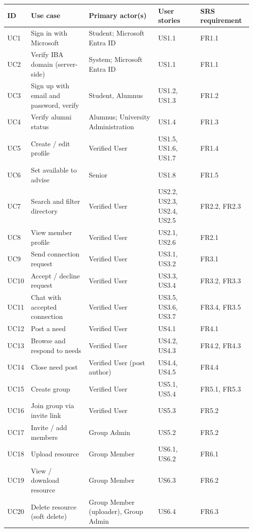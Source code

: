 \documentclass[10pt,a4paper]{article}
\begin{document}
{\small
\begin{longtable}{@{}l >{\raggedright\arraybackslash}p{50mm} >{\raggedright\arraybackslash}p{38mm} >{\raggedright\arraybackslash}p{24mm} >{\raggedright\arraybackslash}p{22mm}@{}}
\toprule
\textbf{ID} & \textbf{Use case} & \textbf{Primary actor(s)} & \textbf{User stories} & \textbf{SRS requirement}\\\midrule\endhead
\bottomrule\endfoot
UC1 & Sign in with Microsoft & Student; Microsoft Entra ID & US1.1 & FR1.1\\
UC2 & Verify IBA domain (server-side) & System; Microsoft Entra ID & US1.1 & FR1.1\\
UC3 & Sign up with email and password, verify & Student, Alumnus & US1.2, US1.3 & FR1.2\\
UC4 & Verify alumni status & Alumnus; University Administration & US1.4 & FR1.3\\
UC5 & Create / edit profile & Verified User & US1.5, US1.6, US1.7 & FR1.4\\
UC6 & Set available to advise & Senior & US1.8 & FR1.5\\
UC7 & Search and filter directory & Verified User & US2.2, US2.3, US2.4, US2.5 & FR2.2, FR2.3\\
UC8 & View member profile & Verified User & US2.1, US2.6 & FR2.1\\
UC9 & Send connection request & Verified User & US3.1, US3.2 & FR3.1\\
UC10 & Accept / decline request & Verified User & US3.3, US3.4 & FR3.2, FR3.3\\
UC11 & Chat with accepted connection & Verified User & US3.5, US3.6, US3.7 & FR3.4, FR3.5\\
UC12 & Post a need & Verified User & US4.1 & FR4.1\\
UC13 & Browse and respond to needs & Verified User & US4.2, US4.3 & FR4.2, FR4.3\\
UC14 & Close need post & Verified User (post author) & US4.4, US4.5 & FR4.4\\
UC15 & Create group & Verified User & US5.1, US5.4 & FR5.1, FR5.3\\
UC16 & Join group via invite link & Verified User & US5.3 & FR5.2\\
UC17 & Invite / add members & Group Admin & US5.2 & FR5.2\\
UC18 & Upload resource & Group Member & US6.1, US6.2 & FR6.1\\
UC19 & View / download resource & Group Member & US6.3 & FR6.2\\
UC20 & Delete resource (soft delete) & Group Member (uploader), Group Admin & US6.4 & FR6.3\\

\end{longtable}}
\end{document}
